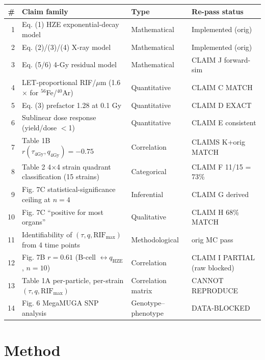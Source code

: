 \documentclass[11pt]{article}
\begin{document}
\begin{longtable}{@{}rp{6.5cm}p{3.5cm}p{3cm}@{}}
\toprule
\# & Claim family & Type & Re-pass status \\
\midrule
1  & Eq. (1) HZE exponential-decay model                            & Mathematical  & Implemented (orig) \\
2  & Eq. (2)/(3)/(4) X-ray model                                    & Mathematical  & Implemented (orig) \\
3  & Eq. (5/6) 4-Gy residual model                                  & Mathematical  & CLAIM J forward-sim \\
4  & LET-proportional RIF/$\mu$m (1.6$\times$ for $^{56}$Fe/$^{40}$Ar) & Quantitative & CLAIM C MATCH \\
5  & Eq. (3) prefactor 1.28 at 0.1 Gy                               & Quantitative  & CLAIM D EXACT \\
6  & Sublinear dose response (yield/dose $<$1)                      & Quantitative  & CLAIM E consistent \\
7  & Table 1B $r(\tau_{4\text{Gy}}, q_{4\text{Gy}}) = -0.75$        & Correlation   & CLAIMS K+orig MATCH \\
8  & Table 2 4$\times$4 strain quadrant classification (15 strains) & Categorical   & CLAIM F 11/15 = 73\% \\
9  & Fig. 7C statistical-significance ceiling at $n=4$              & Inferential   & CLAIM G derived \\
10 & Fig. 7C ``positive for most organs''                           & Qualitative   & CLAIM H 68\% MATCH \\
11 & Identifiability of $(\tau, q, \text{RIF}_{\max})$ from 4 time points & Methodological & orig MC pass \\
12 & Fig. 7B $r = 0.61$ (B-cell $\leftrightarrow q_{\text{HZE}}$, $n=10$) & Correlation & CLAIM I PARTIAL (raw blocked) \\
13 & Table 1A per-particle, per-strain $(\tau, q, \text{RIF}_{\max})$ & Correlation matrix & CANNOT REPRODUCE \\
14 & Fig. 6 MegaMUGA SNP analysis                                    & Genotype--phenotype & DATA-BLOCKED \\
\bottomrule
\end{longtable}

\section{Method}
\end{document}
